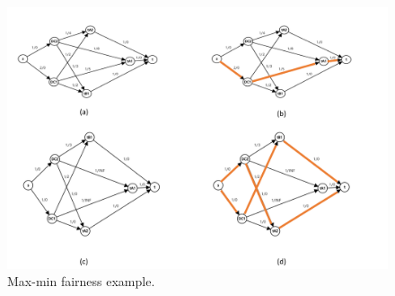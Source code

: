 \begin{figure}[htb]
\includegraphics[width=1\textwidth]{figure/fig-fair.pdf}
\centering
\caption{Max-min fairness example.} \label{fig-fair}
\end{figure}